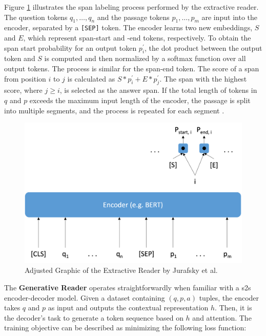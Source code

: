 Figure \ref{fig:extractive_reader} illustrates the span labeling process performed by the extractive reader. The question tokens $q_1, \ldots, q_n$ and the passage tokens $p_1, \ldots, p_m$ are input into the encoder, separated by a \verb|[SEP]| token. The encoder learns two new embeddings, $S$ and $E$, which represent span-start and -end tokens, respectively. To obtain the span start probability for an output token $p_i^{\prime}$, the dot product between the output token and $S$ is computed and then normalized by a softmax function over all output tokens. The process is similar for the span-end token. The score of a span from position $i$ to $j$ is calculated as $S * p_{i}^{\prime} + E * p_{j}^{\prime}$. The span with the highest score, where $j \geq i$, is selected as the answer span. If the total length of tokens in $q$ and $p$ exceeds the maximum input length of the encoder, the passage is split into multiple segments, and the process is repeated for each segment \cite{jurafsky_speech_2023,luo_choose_2022}.

\begin{figure}
    \centering
    \includegraphics[width=\textwidth]{Grafiken/Extractive_Reader.png}
    \caption{Adjusted Graphic of the Extractive Reader by Jurafsky et al. \cite{jurafsky_speech_2023}}
    \label{fig:extractive_reader}
\end{figure}

The \textbf{Generative Reader} operates straightforwardly when familiar with a \gls{s2s} encoder-decoder model. Given a dataset containing $(q,p,a)$ tuples, the encoder takes $q$ and $p$ as input and outputs the contextual representation $h$. Then, it is the decoder's task to generate a token sequence based on $h$ and attention. The training objective can be described as minimizing the following loss function:

